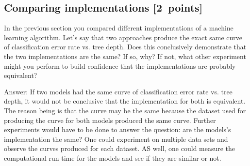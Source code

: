 \documentclass{article}
\newcommand{\gre}[1]{\textcolor{gre}{#1}}
\newcommand\ans[1]{\par\gre{Answer: #1}}
\newcommand\pts[1]{\textcolor{pointscolour}{[#1~points]}}
\begin{document}
  
  \newpage

  \subsection{Comparing implementations \pts{2}}

  In the previous section you compared different implementations of a machine learning algorithm. Let's say that two
  approaches produce the exact same curve of classification error rate vs. tree depth. Does this conclusively demonstrate
  that the two implementations are the same? If so, why? If not, what other experiment might you perform to build confidence
  that the implementations are probably equivalent?
  
  \ans{  \newline
  If two models had the same curve of classification error rate vs. tree depth, it would not be conclusive that the implementation for both is equivalent. The reason being is that the curve may be the same because the dataset used for producing the curve for both models produced the same curve. Further experiments would have to be done to answer the question: are the models's implementation the same? One could experiment on multiple data sets and observe the curves produced for each dataset. AS well, one could measure the computational run time for the models and see if they are similar or not. 
}
\end{document}

